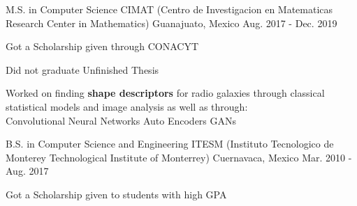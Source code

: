 

\begin{cventries}


\cventry
    {M.S. in Computer Science} %
    {CIMAT (Centro de Investigacion en Matematicas {\enskip\cdotp\enskip} Research Center in Mathematics)} %
    {Guanajuato, Mexico} %
    {Aug. 2017 - Dec. 2019} %
    {
    \begin{cvitems} %
        \item {Got a Scholarship given through CONACYT}
        \item {Did not graduate {\enskip\cdotp\enskip} Unfinished Thesis}
        \item {Worked on finding \textbf{shape descriptors} for radio galaxies through classical statistical models and image analysis as well as through:\\ 
        {\enskip\cdotp\enskip} Convolutional Neural Networks {\enskip\cdotp\enskip} Auto Encoders {\enskip\cdotp\enskip} GANs}
    \end{cvitems}
    }
  \cventry
    {B.S. in Computer Science and Engineering} %
    {ITESM ({Instituto Tecnologico de Monterey\enskip\cdotp\enskip} Technological Institute of Monterrey)} %
    {Cuernavaca, Mexico} %
    {Mar. 2010 - Aug. 2017} %
    {
      \begin{cvitems} %
        \item {Got a Scholarship given to students with high GPA}
      \end{cvitems}
    }

\end{cventries}